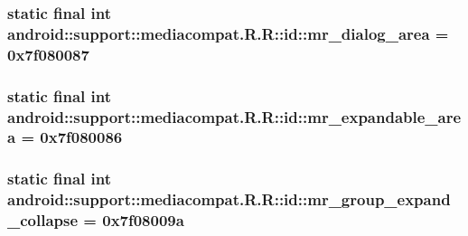 \hypertarget{classandroid_1_1support_1_1mediacompat_1_1_r_1_1id_251b8e9da9188439ec7f0e6a579d1d15}{
\subsubsection[{mr\_\-dialog\_\-area}]{\setlength{\rightskip}{0pt plus 5cm}static final int android::support::mediacompat.R.R::id::mr\_\-dialog\_\-area = 0x7f080087}}
\label{classandroid_1_1support_1_1mediacompat_1_1_r_1_1id_251b8e9da9188439ec7f0e6a579d1d15}


\hypertarget{classandroid_1_1support_1_1mediacompat_1_1_r_1_1id_633ab700983aee8ff34891cb3e79d6cc}{
\subsubsection[{mr\_\-expandable\_\-area}]{\setlength{\rightskip}{0pt plus 5cm}static final int android::support::mediacompat.R.R::id::mr\_\-expandable\_\-area = 0x7f080086}}
\label{classandroid_1_1support_1_1mediacompat_1_1_r_1_1id_633ab700983aee8ff34891cb3e79d6cc}


\hypertarget{classandroid_1_1support_1_1mediacompat_1_1_r_1_1id_129bf1e256acb19feaadd0a02132823a}{
\subsubsection[{mr\_\-group\_\-expand\_\-collapse}]{\setlength{\rightskip}{0pt plus 5cm}static final int android::support::mediacompat.R.R::id::mr\_\-group\_\-expand\_\-collapse = 0x7f08009a}}
\label{classandroid_1_1support_1_1mediacompat_1_1_r_1_1id_129bf1e256acb19feaadd0a02132823a}


